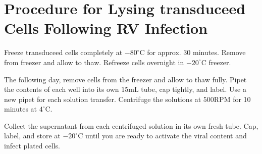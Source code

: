 \section{Procedure for Lysing transduceed Cells Following RV Infection}

Freeze transduceed cells completely at $-80^{\circ}$C for approx. 30 minutes. Remove from freezer and allow to thaw. Refreeze cells overnight in $-20^{\circ}$C freezer.

The following day, remove cells from the freezer and allow to thaw fully. Pipet the contents of each well into its own $15$mL tube, cap tightly, and label. Use a new pipet for each solution transfer. Centrifuge the solutions at $500$RPM for 10 minutes at $4^{\circ}$C.

Collect the supernatant from each centrifuged solution in its own fresh tube. Cap, label, and store at $-20^{\circ}$C until you are ready to activate the viral content and infect plated cells.